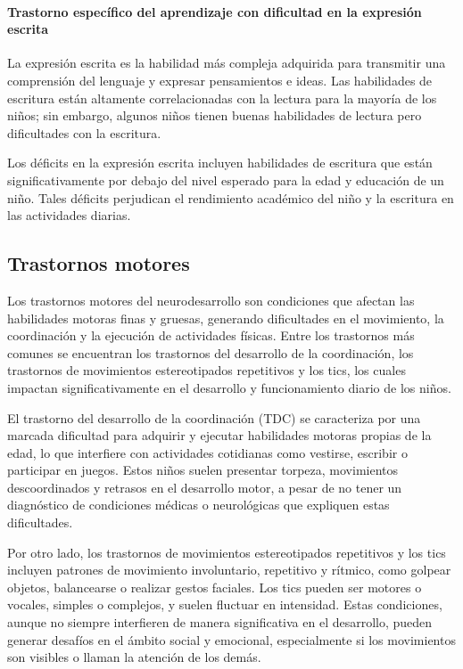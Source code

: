 \documentclass[11pt,letterpaper]{report}
\begin{document}
\paragraph{Trastorno específico del aprendizaje con dificultad en la expresión escrita}
La expresión escrita es la habilidad más compleja adquirida para transmitir
una comprensión del lenguaje y expresar pensamientos e ideas. Las habilidades
de escritura están altamente correlacionadas con la lectura para la mayoría de
los niños; sin embargo, algunos niños tienen buenas habilidades de lectura
pero dificultades con la escritura.

Los déficits en la expresión escrita incluyen habilidades de escritura que
están significativamente por debajo del nivel esperado para la edad y
educación de un niño. Tales déficits perjudican el rendimiento académico del
niño y la escritura en las actividades diarias.

\subsection{Trastornos motores}
Los trastornos motores del neurodesarrollo son condiciones que afectan las
habilidades motoras finas y gruesas, generando dificultades en el movimiento,
la coordinación y la ejecución de actividades físicas. Entre los trastornos más
comunes se encuentran los trastornos del desarrollo de la coordinación, los
trastornos de movimientos estereotipados repetitivos y los tics, los cuales
impactan significativamente en el desarrollo y funcionamiento diario de los
niños. \cite{DSM5TR}

El trastorno del desarrollo de la coordinación (TDC) se caracteriza por una
marcada dificultad para adquirir y ejecutar habilidades motoras propias de la
edad, lo que interfiere con actividades cotidianas como vestirse, escribir o
participar en juegos. Estos niños suelen presentar torpeza, movimientos
descoordinados y retrasos en el desarrollo motor, a pesar de no tener un
diagnóstico de condiciones médicas o neurológicas que expliquen estas
dificultades. \cite{DSM5TR}

Por otro lado, los trastornos de movimientos estereotipados repetitivos y los
tics incluyen patrones de movimiento involuntario, repetitivo y rítmico, como
golpear objetos, balancearse o realizar gestos faciales. Los tics pueden ser
motores o vocales, simples o complejos, y suelen fluctuar en intensidad. Estas
condiciones, aunque no siempre interfieren de manera significativa en el
desarrollo, pueden generar desafíos en el ámbito social y emocional,
especialmente si los movimientos son visibles o llaman la atención de los
demás. \cite{DSM5TR}
\end{document}
